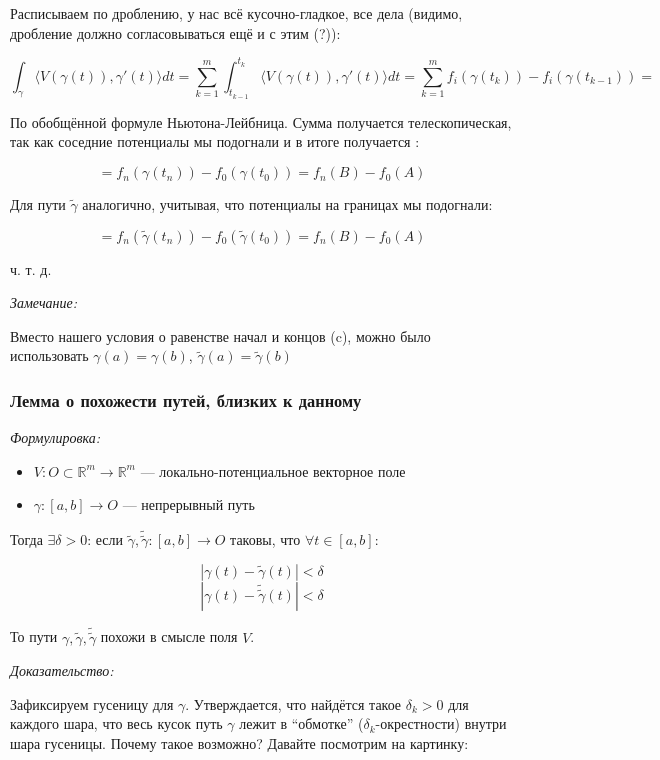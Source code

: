 \documentclass{article}
\def\sk#1#2{\langle #1, #2 \rangle}
\begin{document}
Расписываем по дроблению, у нас всё кусочно-гладкое, все дела (видимо, дробление должно согласовываться ещё и с этим (?)):

\[\int_{\gamma} \sk{V(\gamma(t))}{\gamma'(t)} dt = \sum_{k = 1}^m \int_{t_{k - 1}}^{t_k} \sk{V(\gamma(t))}{\gamma'(t)} dt = \sum_{k = 1}^m f_i(\gamma(t_k)) - f_i(\gamma(t_{k - 1})) = \] 

По обобщённой формуле Ньютона-Лейбница. Сумма получается телескопическая, так как соседние потенциалы мы подогнали и в итоге получается :

\[= f_n(\gamma(t_n)) - f_0(\gamma(t_0)) = f_n(B) - f_0(A)\]

Для пути $\tilde{\gamma}$ аналогично, учитывая, что потенциалы на границах мы подогнали:

\[= f_n(\tilde{\gamma}(t_n)) - f_0(\tilde{\gamma}(t_0)) = f_n(B) - f_0(A)\]

ч. т. д. 

\textit{Замечание:}

Вместо нашего условия о равенстве начал и концов (c), можно было использовать $\gamma(a) = \gamma(b)$, $\tilde{\gamma}(a) = \tilde{\gamma}(b)$

\subsubsection{Лемма о похожести путей, близких к данному}
\textit{Формулировка:}

\begin{itemize}
    \item $V: O \subset \mathbb{R}^m \rightarrow \mathbb{R}^m$ --- локально-потенциальное векторное поле
    \item $\gamma: [a, b] \rightarrow O$ --- непрерывный путь
\end{itemize}

Тогда $\exists \delta > 0$: если $\tilde{\gamma}, \tilde{\tilde{\gamma}}: [a, b] \rightarrow O$ таковы, что $\forall t \in [a, b]$:

\[|\gamma(t) - \tilde{\gamma}(t)| < \delta\]
\[|\gamma(t) - \tilde{\tilde{\gamma}}(t)| < \delta\]

То пути $\gamma, \tilde{\gamma}, \tilde{\tilde{\gamma}}$ похожи в смысле поля $V$.

\textit{Доказательство:}

Зафиксируем гусеницу для $\gamma$. Утверждается, что найдётся такое $\delta_k > 0$ для каждого шара, что весь кусок путь $\gamma$ лежит в ``обмотке'' ($\delta_k$-окрестности) внутри шара гусеницы. Почему такое возможно? Давайте посмотрим на картинку:
\end{document}
